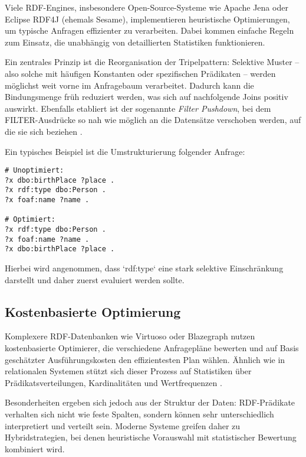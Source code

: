 \documentclass[12pt]{article}
\begin{document}
Viele RDF-Engines, insbesondere Open-Source-Systeme wie Apache Jena oder Eclipse RDF4J (ehemals Sesame), implementieren heuristische Optimierungen, um typische Anfragen effizienter zu verarbeiten. Dabei kommen einfache Regeln zum Einsatz, die unabhängig von detaillierten Statistiken funktionieren.

Ein zentrales Prinzip ist die Reorganisation der Tripelpattern: Selektive Muster – also solche mit häufigen Konstanten oder spezifischen Prädikaten – werden möglichst weit vorne im Anfragebaum verarbeitet. Dadurch kann die Bindungsmenge früh reduziert werden, was sich auf nachfolgende Joins positiv auswirkt. Ebenfalls etabliert ist der sogenannte \textit{Filter Pushdown}, bei dem FILTER-Ausdrücke so nah wie möglich an die Datensätze verschoben werden, auf die sie sich beziehen \cite{yuan2015heuristics}.

Ein typisches Beispiel ist die Umstrukturierung folgender Anfrage:

\begin{lstlisting}[caption=Unoptimierte vs. heuristisch optimierte Reihenfolge von Tripeln]
# Unoptimiert:
?x dbo:birthPlace ?place .
?x rdf:type dbo:Person .
?x foaf:name ?name .

# Optimiert:
?x rdf:type dbo:Person .
?x foaf:name ?name .
?x dbo:birthPlace ?place .
\end{lstlisting}

Hierbei wird angenommen, dass `rdf:type` eine stark selektive Einschränkung darstellt und daher zuerst evaluiert werden sollte.

\subsection{Kostenbasierte Optimierung}

Komplexere RDF-Datenbanken wie Virtuoso oder Blazegraph nutzen kostenbasierte Optimierer, die verschiedene Anfragepläne bewerten und auf Basis geschätzter Ausführungskosten den effizientesten Plan wählen. Ähnlich wie in relationalen Systemen stützt sich dieser Prozess auf Statistiken über Prädikatsverteilungen, Kardinalitäten und Wertfrequenzen \cite{sequeda2014cost}.

Besonderheiten ergeben sich jedoch aus der Struktur der Daten: RDF-Prädikate verhalten sich nicht wie feste Spalten, sondern können sehr unterschiedlich interpretiert und verteilt sein. Moderne Systeme greifen daher zu Hybridstrategien, bei denen heuristische Vorauswahl mit statistischer Bewertung kombiniert wird.
\end{document}
